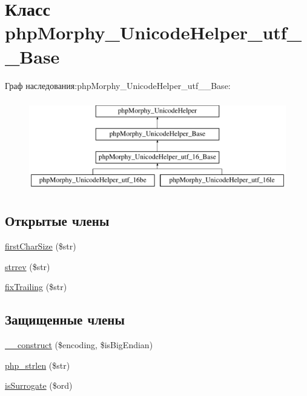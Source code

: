 \hypertarget{classphpMorphy__UnicodeHelper__utf__16__Base}{
\section{Класс phpMorphy\_\-UnicodeHelper\_\-utf\_\_\-Base}
\label{classphpMorphy__UnicodeHelper__utf__16__Base}
}
Граф наследования:phpMorphy\_\-UnicodeHelper\_\-utf\_\_\-Base:\begin{figure}[H]
\begin{center}
\leavevmode
\includegraphics[height=4.000000cm]{classphpMorphy__UnicodeHelper__utf__16__Base}
\end{center}
\end{figure}
\subsection*{Открытые члены}
\begin{DoxyCompactItemize}
\item 
\hyperlink{classphpMorphy__UnicodeHelper__utf__16__Base_a31ad402bbf731c6cbb0a31edd5c8ffcf}{firstCharSize} (\$str)
\item 
\hyperlink{classphpMorphy__UnicodeHelper__utf__16__Base_af406da7ce4e7c4eb67534465d3df4801}{strrev} (\$str)
\item 
\hyperlink{classphpMorphy__UnicodeHelper__utf__16__Base_a0ff2ad65ba2b5b65971e37a9116aa3bb}{fixTrailing} (\$str)
\end{DoxyCompactItemize}
\subsection*{Защищенные члены}
\begin{DoxyCompactItemize}
\item 
\hyperlink{classphpMorphy__UnicodeHelper__utf__16__Base_a3e3f99084c44b2ba37f385c0dc7940b2}{\_\-\_\-construct} (\$encoding, \$isBigEndian)
\item 
\hyperlink{classphpMorphy__UnicodeHelper__utf__16__Base_ac91088409e01c9e78b4c46f9a3946c88}{php\_\-strlen} (\$str)
\item 
\hyperlink{classphpMorphy__UnicodeHelper__utf__16__Base_ab196a066d127a1167a33751215b77d46}{isSurrogate} (\$ord)
\end{DoxyCompactItemize}
